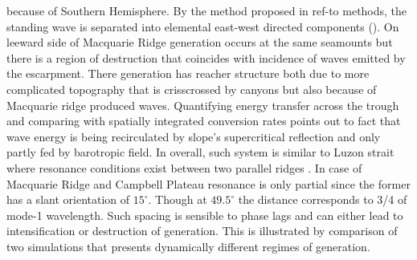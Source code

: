 \documentclass[12pt]{article}
\begin{document}
 because of Southern Hemisphere. By the method proposed in 
ref-to methods, the standing wave is separated into elemental east-west directed components 
(). On leeward side of Macquarie Ridge generation occurs at the same 
seamounts but there is a region of destruction that coincides with incidence of waves emitted by 
the escarpment. There generation has reacher structure both due to more complicated 
topography that is crisscrossed by canyons but also because of Macquarie ridge produced waves. 
Quantifying energy transfer across the trough and comparing with spatially integrated conversion 
rates points out to fact that wave energy is being recirculated by slope's supercritical 
reflection and only partly fed by barotropic field. In overall, such system is similar to Luzon 
strait where resonance conditions exist between two parallel ridges \citep{buijsman2014three}. In 
case of Macquarie Ridge and Campbell Plateau resonance is only partial since the former has a slant 
orientation of $15^{\circ}$. Though at $49.5^{\circ}$ the distance corresponds to 3/4 of mode-1 
wavelength. Such spacing is sensible to phase lags and can either lead to intensification or 
destruction of generation. This is illustrated by comparison of two simulations that presents 
dynamically different regimes of generation.\\
\end{document}
